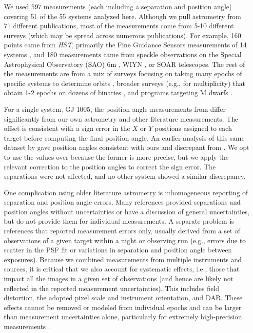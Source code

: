 \documentclass[twocolumn]{aastex62}
\begin{document}
We used 597 measurements (each including a separation and position angle) covering 51 of the 55 systems analyzed here. Although we pull astrometry from 71 different publications, most of the measurements come from 5-10 different surveys (which may be spread across numerous publications). For example, 160 points came from {\it HST}, primarily the Fine Guidance Sensors measurements of 14 systems \citep[e.g.,][]{Benedict2016}, and 180 measurements came from speckle observations on the Special Astrophysical Observatory (SAO) 6m \citep[e.g.,][]{Bag2002}, WIYN \citep[e.g.,][]{Hor2017}, or SOAR \citep[e.g.,][]{Tok2017} telescopes. The rest of the measurements are from a mix of surveys focusing on taking many epochs of specific systems to determine orbits \citep[e.g.,][]{Koh2012}, broader surveys (e.g., for multiplicity) that obtain 1-2 epochs on dozens of binaries \citep[e.g.,][]{Jnn2012}, and programs targeting M dwarfs \citep[e.g.,][]{Mason2018}.

For a single system, GJ 1005, the position angle measurements from \citet{Benedict2016} differ significantly from our own astrometry and other literature measurements. The offset is consistent with a sign error in the $X$ or $Y$ positions assigned to each target before computing the final position angle. An earlier analysis of this same dataset by \citet{1998AJ....116.1440H} gave position angles consistent with ours and discrepant from \citet{Benedict2016}. We opt to use the \citet{Benedict2016} values over \citet{1998AJ....116.1440H} because the former is more precise, but we apply the relevant correction to the \citet{Benedict2016} position angles to correct the sign error. The separations were not affected, and no other system showed a similar discrepancy. 

One complication using older literature astrometry is inhomogeneous reporting of separation and position angle errors. Many references provided separations and position angles without uncertainties or have a discussion of general uncertainties, but do not provide them for individual measurements. A separate problem is references that reported measurement errors only, usually derived from a set of observations of a given target within a night or observing run (e.g., errors due to scatter in the PSF fit or variations in separation and position angle between exposures). Because we combined measurements from multiple instruments and sources, it is critical that we also account for systematic effects, i.e., those that impact all the images in a given set of observations (and hence are likely not reflected in the reported measurement uncertainties). This includes field distortion, the adopted pixel scale and instrument orientation, and DAR. These effects cannot be removed or modeled from individual epochs and can be larger than measurement uncertainties alone, particularly for extremely high-precision measurements \citep[e.g.,][]{2009ApJ...690.1463L}.
\end{document}
